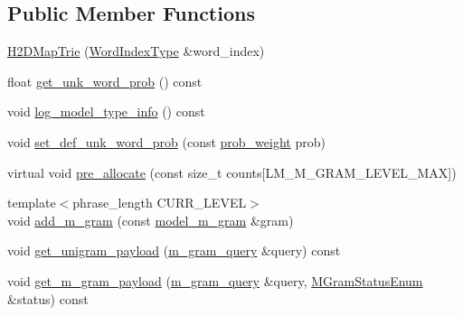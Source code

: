 \subsection*{Public Member Functions}
\begin{DoxyCompactItemize}
\item 
\hyperlink{classuva_1_1smt_1_1bpbd_1_1server_1_1lm_1_1_h2_d_map_trie_a5866140ea6eecdecc74fb34ed9f80282}{H2\+D\+Map\+Trie} (\hyperlink{classuva_1_1smt_1_1bpbd_1_1server_1_1lm_1_1_word_index_trie_base_a77ee32bf3a9f8a89558bda4f2031200c}{Word\+Index\+Type} \&word\+\_\+index)
\item 
float \hyperlink{classuva_1_1smt_1_1bpbd_1_1server_1_1lm_1_1_h2_d_map_trie_aa07743d53b035719f6b127358a3a22c0}{get\+\_\+unk\+\_\+word\+\_\+prob} () const 
\item 
void \hyperlink{classuva_1_1smt_1_1bpbd_1_1server_1_1lm_1_1_h2_d_map_trie_aa3c5430e3afc73a3829556e7a0715e61}{log\+\_\+model\+\_\+type\+\_\+info} () const 
\item 
void \hyperlink{classuva_1_1smt_1_1bpbd_1_1server_1_1lm_1_1_h2_d_map_trie_af5bb09b69b308634e2f66bbd2eeae724}{set\+\_\+def\+\_\+unk\+\_\+word\+\_\+prob} (const \hyperlink{namespaceuva_1_1smt_1_1bpbd_1_1server_a01e9ea4de9c226f4464862e84ff0bbcc}{prob\+\_\+weight} prob)
\item 
virtual void \hyperlink{classuva_1_1smt_1_1bpbd_1_1server_1_1lm_1_1_h2_d_map_trie_a208d240c6674d38d0a11373841d3a23e}{pre\+\_\+allocate} (const size\+\_\+t counts\mbox{[}L\+M\+\_\+\+M\+\_\+\+G\+R\+A\+M\+\_\+\+L\+E\+V\+E\+L\+\_\+\+M\+A\+X\mbox{]})
\item 
{\footnotesize template$<$phrase\+\_\+length C\+U\+R\+R\+\_\+\+L\+E\+V\+E\+L$>$ }\\void \hyperlink{classuva_1_1smt_1_1bpbd_1_1server_1_1lm_1_1_h2_d_map_trie_a447f8a21d08f19e9fb0431cbe3d901b4}{add\+\_\+m\+\_\+gram} (const \hyperlink{classuva_1_1smt_1_1bpbd_1_1server_1_1lm_1_1m__grams_1_1model__m__gram}{model\+\_\+m\+\_\+gram} \&gram)
\item 
void \hyperlink{classuva_1_1smt_1_1bpbd_1_1server_1_1lm_1_1_h2_d_map_trie_abb7593d444dc133a9810d1c90c1eb0c0}{get\+\_\+unigram\+\_\+payload} (\hyperlink{classuva_1_1smt_1_1bpbd_1_1server_1_1lm_1_1m__gram__query}{m\+\_\+gram\+\_\+query} \&query) const 
\item 
void \hyperlink{classuva_1_1smt_1_1bpbd_1_1server_1_1lm_1_1_h2_d_map_trie_ae83c522384308bdb3c5143485c8c03a1}{get\+\_\+m\+\_\+gram\+\_\+payload} (\hyperlink{classuva_1_1smt_1_1bpbd_1_1server_1_1lm_1_1m__gram__query}{m\+\_\+gram\+\_\+query} \&query, \hyperlink{namespaceuva_1_1smt_1_1bpbd_1_1server_1_1lm_ab9b3e7382b561dcb8abcd6b55e9b796a}{M\+Gram\+Status\+Enum} \&status) const 

\end{DoxyCompactItemize}
